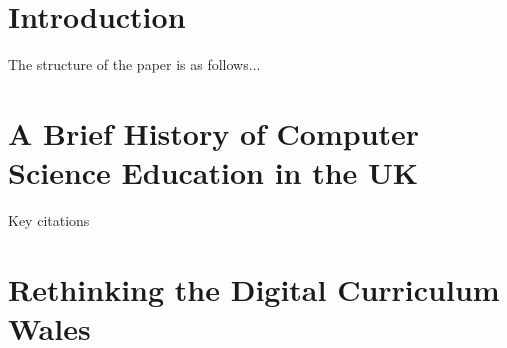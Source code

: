 \documentclass[sigconf]{acmart}
\begin{document}

\maketitle



\section{Introduction}

The structure of the paper is as follows...

\section{A Brief History of Computer Science Education in the UK}

Key citations~\cite{crick+sentance:2011,brown-et-al:sigcse2013,brown-et-al:toce2014,tryfonas+crick:petra2018}

\section{Rethinking the Digital Curriculum Wales}

\end{document}
